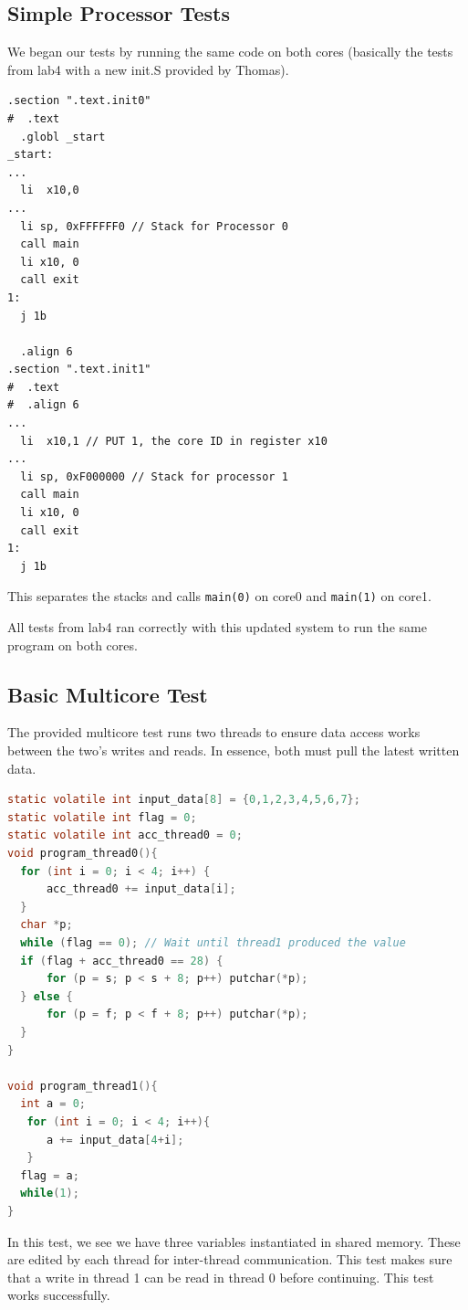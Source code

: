 \documentclass{article}
\begin{document}
\subsection{Simple Processor Tests}

We began our tests by running the same code on both cores (basically the tests from lab4 with a new init.S provided by Thomas).

\begin{lstlisting}[language=RSVAssembler]
.section ".text.init0"
#  .text
  .globl _start
_start:
...
  li  x10,0
...
  li sp, 0xFFFFFF0 // Stack for Processor 0
  call main
  li x10, 0
  call exit
1:
  j 1b

  .align 6
.section ".text.init1"
#  .text
#  .align 6
...
  li  x10,1 // PUT 1, the core ID in register x10
...
  li sp, 0xF000000 // Stack for processor 1
  call main
  li x10, 0
  call exit
1:
  j 1b
\end{lstlisting}

This separates the stacks and calls \lstinline|main(0)| on core0 and \lstinline|main(1)| on core1.

All tests from lab4 ran correctly with this updated system to run the same program on both cores.

\subsection{Basic Multicore Test}

The provided multicore test runs two threads to ensure data access works between the two's writes and reads. In essence, both must pull the latest written data.

\begin{lstlisting}[language=C]
static volatile int input_data[8] = {0,1,2,3,4,5,6,7};
static volatile int flag = 0;
static volatile int acc_thread0 = 0;
void program_thread0(){
  for (int i = 0; i < 4; i++) {
      acc_thread0 += input_data[i];
  }
  char *p;
  while (flag == 0); // Wait until thread1 produced the value
  if (flag + acc_thread0 == 28) {
      for (p = s; p < s + 8; p++) putchar(*p);
  } else {
      for (p = f; p < f + 8; p++) putchar(*p);
  }
}

void program_thread1(){
  int a = 0;
   for (int i = 0; i < 4; i++){
      a += input_data[4+i];
   }
  flag = a;
  while(1);
}
\end{lstlisting}
In this test, we see we have three variables instantiated in shared memory. These are edited by each thread for inter-thread communication. This test makes sure that a write in thread 1 can be read in thread 0 before continuing. This test works successfully.
\end{document}
